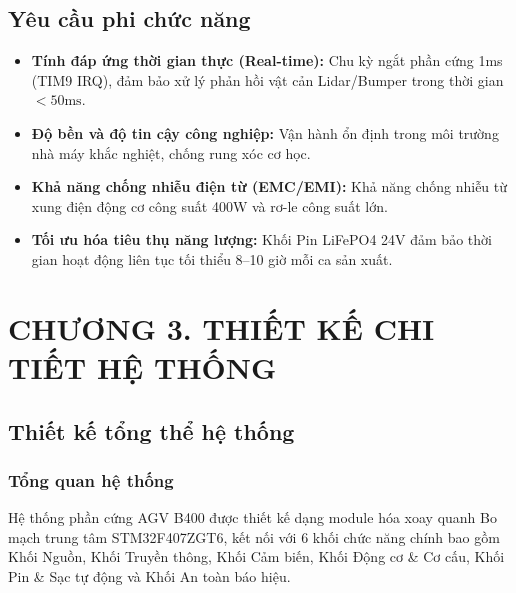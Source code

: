 \documentclass{article}
\begin{document}
\subsection{Yêu cầu phi chức năng}
\begin{itemize}
    \item \textbf{Tính đáp ứng thời gian thực (Real-time):} Chu kỳ ngắt phần cứng 1ms (TIM9 IRQ), đảm bảo xử lý phản hồi vật cản Lidar/Bumper trong thời gian $<50\text{ms}$.
    \item \textbf{Độ bền và độ tin cậy công nghiệp:} Vận hành ổn định trong môi trường nhà máy khắc nghiệt, chống rung xóc cơ học.
    \item \textbf{Khả năng chống nhiễu điện từ (EMC/EMI):} Khả năng chống nhiễu từ xung điện động cơ công suất 400W và rơ-le công suất lớn.
    \item \textbf{Tối ưu hóa tiêu thụ năng lượng:} Khối Pin LiFePO4 24V đảm bảo thời gian hoạt động liên tục tối thiểu 8--10 giờ mỗi ca sản xuất.
\end{itemize}

\newpage

\clearpage
\section*{CHƯƠNG 3. THIẾT KẾ CHI TIẾT HỆ THỐNG}
\setcounter{section}{3}
\setcounter{subsection}{0}
\setcounter{figure}{0}
\setcounter{table}{0}

\subsection{Thiết kế tổng thể hệ thống}

\subsubsection{Tổng quan hệ thống}
Hệ thống phần cứng AGV B400 được thiết kế dạng module hóa xoay quanh Bo mạch trung tâm STM32F407ZGT6, kết nối với 6 khối chức năng chính bao gồm Khối Nguồn, Khối Truyền thông, Khối Cảm biến, Khối Động cơ \& Cơ cấu, Khối Pin \& Sạc tự động và Khối An toàn báo hiệu.
\end{document}
